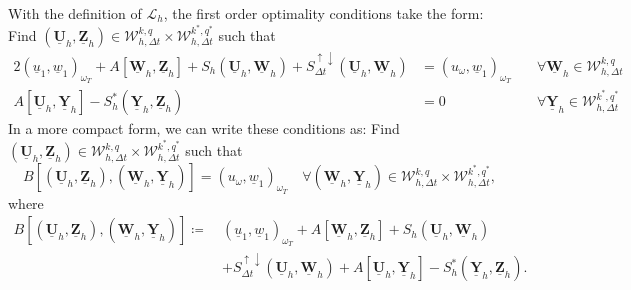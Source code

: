 \documentclass[sn-mathphys-num]{sn-jnl}
\numberwithin{equation}{section}
\newcommand{\cL}{\mathcal{L}}
\newcommand{\ProdFullyDiscrSpace}[2]{ \mathcal{W}^{ {#1},{#2}}_{h, \Delta t  } }
\newcommand{\Uh}{\underline{\mathbf{U}}_h}
\newcommand{\Yh}{\underline{\mathbf{Y}}_h}
\newcommand{\Zh}{\underline{\mathbf{Z}}_h}
\newcommand{\Wh}{\underline{\mathbf{W}}_h}
\newcommand{\ul}{\underline{u}}
\newcommand{\wl}{\underline{w}}
\newcommand{\Sud}{S^{\uparrow \downarrow}_{\Delta t}}
\begin{document}
\noindent With the definition of $\cL_h$, the first order optimality conditions take the form: Find $(\Uh,\Zh) \in \ProdFullyDiscrSpace{k}{q} \times \ProdFullyDiscrSpace{k^\ast}{q^\ast}$ such that 
\begin{alignat*}{2}
    (\ul_1,\wl_1)_{\omega_T} \! + \! A[\Wh,\Zh] + S_h(\Uh,\Wh) + \Sud(\Uh,\Wh) &= (u_{\omega},\wl_1)_{\omega_T} \ &&\forall \Wh \in \ProdFullyDiscrSpace{k}{q} \\
    A[\Uh,\Yh] -  S_h^\ast(\Yh,\Zh) &= 0 \ &&\forall \Yh \in \ProdFullyDiscrSpace{k^\ast}{q^\ast} 
\end{alignat*}
In a more compact form, we can write these conditions as: Find $(\Uh,\Zh) \in \ProdFullyDiscrSpace{k}{q} \times \ProdFullyDiscrSpace{k^\ast}{q^\ast}$ such that
\begin{equation}\label{eq:discreteProblem}
    B[(\Uh,\Zh),(\Wh,\Yh)] = (u_{\omega},\wl_1)_{\omega_T} \quad \forall (\Wh,\Yh) \in \ProdFullyDiscrSpace{k}{q} \times \ProdFullyDiscrSpace{k^\ast}{q^\ast},
\end{equation}
where 
\begin{equation}
    \begin{aligned}
        B[(\Uh,\Zh),(\Wh,\Yh)] \coloneqq \ &(\ul_1,\wl_1)_{\omega_T} + A[\Wh,\Zh]+ S_h(\Uh,\Wh) \\
        &+  \Sud(\Uh,\Wh) + A[\Uh,\Yh] - S_h^\ast(\Yh,\Zh).
    \end{aligned}
\end{equation}
\end{document}
